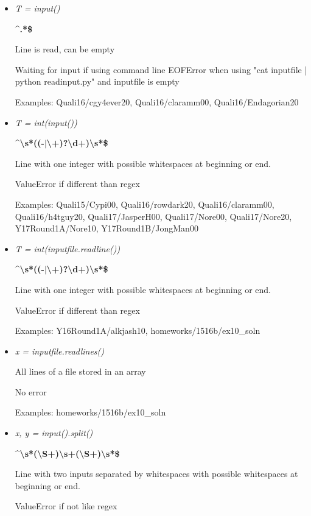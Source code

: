 \documentclass[11pt]{article}
\begin{document}
\begin{itemize}
\item \textit{T = input()} 

\textbf{\textasciicircum.*\$} 

Line is read, can be empty

Waiting for input if using command line
EOFError when using "cat inputfile | python readinput.py" and inputfile is empty

Examples: Quali16/cgy4ever20, Quali16/claramm00, Quali16/Endagorian20

\item \textit{T = int(input())} 

\textbf{\textasciicircum\textbackslash{}s*((-$|$\textbackslash{}+)?\textbackslash{}d+)\textbackslash{}s*\$} 

Line with one integer with possible whitespaces at beginning or end.

ValueError if different than regex

Examples: Quali15/Cypi00, Quali16/rowdark20, Quali16/claramm00, Quali16/h4tguy20, Quali17/JasperH00, Quali17/Nore00, Quali17/Nore20, Y17Round1A/Nore10, Y17Round1B/JongMan00

\item \textit{T = int(inputfile.readline())} 

\textbf{\textasciicircum\textbackslash{}s*((-$|$\textbackslash{}+)?\textbackslash{}d+)\textbackslash{}s*\$} 

Line with one integer with possible whitespaces at beginning or end.

ValueError if different than regex

Examples: Y16Round1A/alkjash10, homeworks/1516b/ex10\_soln

\item \textit{x = inputfile.readlines()} 

All lines of a file stored in an array

No error

Examples: homeworks/1516b/ex10\_soln

\item \textit{x, y = input().split()}

\textbf{\textasciicircum\textbackslash{}s*(\textbackslash{}S+)\textbackslash{}s+(\textbackslash{}S+)\textbackslash{}s*\$} 

Line with two inputs separated by whitespaces with possible whitespaces at beginning or end.

ValueError if not like regex


\end{itemize}
\end{document}
